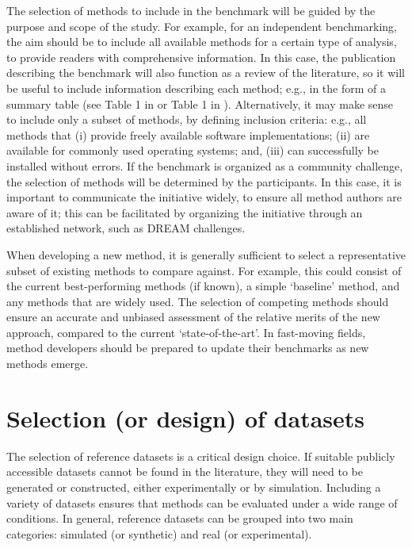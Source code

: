 \documentclass[12pt, a4paper]{article}
\begin{document}
The selection of methods to include in the benchmark will be guided by the purpose and scope of the study. For example, for an independent benchmarking, the aim should be to include all available methods for a certain type of analysis, to provide readers with comprehensive information. In this case, the publication describing the benchmark will also function as a review of the literature, so it will be useful to include information describing each method; e.g., in the form of a summary table (see Table 1 in \citep{Weber2016} or Table 1 in \citep{Saelens2018b}). Alternatively, it may make sense to include only a subset of methods, by defining inclusion criteria: e.g., all methods that (i) provide freely available software implementations; (ii) are available for commonly used operating systems; and, (iii) can successfully be installed without errors. If the benchmark is organized as a community challenge, the selection of methods will be determined by the participants. In this case, it is important to communicate the initiative widely, to ensure all method authors are aware of it; this can be facilitated by organizing the initiative through an established network, such as DREAM challenges.

When developing a new method, it is generally sufficient to select a representative subset of existing methods to compare against. For example, this could consist of the current best-performing methods (if known), a simple `baseline' method, and any methods that are widely used. The selection of competing methods should ensure an accurate and unbiased assessment of the relative merits of the new approach, compared to the current `state-of-the-art'. In fast-moving fields, method developers should be prepared to update their benchmarks as new methods emerge.




\section*{Selection (or design) of datasets}

The selection of reference datasets is a critical design choice. If suitable publicly accessible datasets cannot be found in the literature, they will need to be generated or constructed, either experimentally or by simulation. Including a variety of datasets ensures that methods can be evaluated under a wide range of conditions. In general, reference datasets can be grouped into two main categories: simulated (or synthetic) and real (or experimental).
\end{document}
